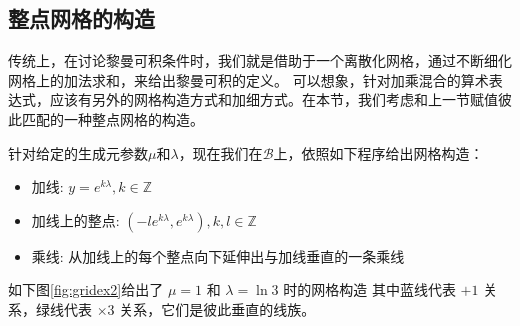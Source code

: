\documentclass[a4paper,12pt]{article}
\numberwithin{definition}{section}
\numberwithin{lemma}{section}
\numberwithin{proposition}{section}
\numberwithin{theorem}{section}
\numberwithin{grammar}{section}
\numberwithin{program}{section}
\numberwithin{convention}{section}
\numberwithin{corollary}{section}
\begin{document}
\subsection{整点网格的构造}

传统上，在讨论黎曼可积条件时，我们就是借助于一个离散化网格，通过不断细化网格上的加法求和，来给出黎曼可积的定义。
可以想象，针对加乘混合的算术表达式，应该有另外的网格构造方式和加细方式。在本节，我们考虑和上一节赋值彼此匹配的一种整点网格的构造。

针对给定的生成元参数$\mu$和$\lambda$，现在我们在$\mathcal{B}$上，依照如下程序给出网格构造：
\begin{itemize}
    \item 加线: $y = e^{k\lambda}, k \in \mathbb{Z}$
    \item 加线上的整点: $(- l e^{k\lambda} , e^{k\lambda}), k, l \in \mathbb{Z}$
    \item 乘线: 从加线上的每个整点向下延伸出与加线垂直的一条乘线
\end{itemize}

如下图\ref{fig:gridex2}给出了 $\mu = 1$ 和 $\lambda = \ln 3$ 时的网格构造
其中蓝线代表 $+ 1$ 关系，绿线代表 $\times 3$ 关系，它们是彼此垂直的线族。
\end{document}
